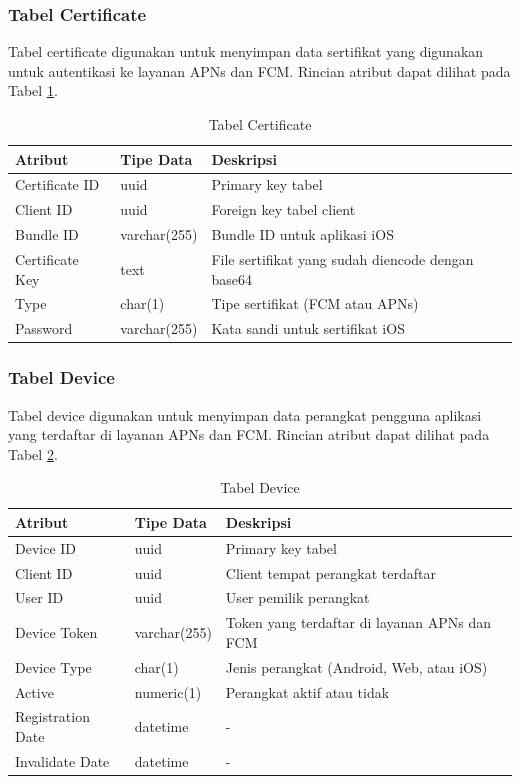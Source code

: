\subsubsection{Tabel Certificate}
\par Tabel certificate digunakan untuk menyimpan data sertifikat yang digunakan untuk autentikasi ke layanan APNs dan FCM. Rincian atribut dapat dilihat pada Tabel \ref{tabel_certificate}.
\begin{longtable}{|p{2cm}|p{2.5cm}|p{4.5cm}|}
	\caption{Tabel Certificate} \label{tabel_certificate} \\ \hline
    {Atribut} & {Tipe Data} & {Deskripsi} \\ \hline
    Certificate ID & uuid & Primary key tabel \\ \hline
    Client ID & uuid & Foreign key tabel client \\ \hline
    Bundle ID & varchar(255) & Bundle ID untuk aplikasi iOS \\ \hline
    Certificate Key & text & File sertifikat yang sudah diencode dengan base64 \\ \hline
    Type & char(1) & Tipe sertifikat (FCM atau APNs) \\ \hline
    Password & varchar(255) & Kata sandi untuk sertifikat iOS \\ \hline
\end{longtable}

\subsubsection{Tabel Device}
\par Tabel device digunakan untuk menyimpan data perangkat pengguna aplikasi yang terdaftar di layanan APNs dan FCM. Rincian atribut dapat dilihat pada Tabel \ref{tabel_device}.
\begin{longtable}{|p{2cm}|p{2.5cm}|p{4.5cm}|}
	\caption{Tabel Device} \label{tabel_device} \\ \hline
    {Atribut} & {Tipe Data} & {Deskripsi} \\ \hline
    Device ID & uuid & Primary key tabel \\ \hline
    Client ID & uuid & Client tempat perangkat terdaftar \\ \hline
    User ID & uuid & User pemilik perangkat \\ \hline
    Device Token & varchar(255) & Token yang terdaftar di layanan APNs dan FCM \\ \hline
    Device Type & char(1) & Jenis perangkat (Android, Web, atau iOS) \\ \hline
    Active & numeric(1) & Perangkat aktif atau tidak \\ \hline
    Registration Date & datetime & - \\ \hline
    Invalidate Date & datetime & - \\ \hline
\end{longtable}

